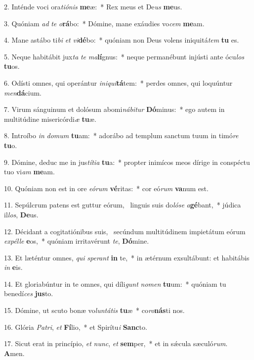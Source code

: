 2. Inténde voci ora\textit{ti}\textit{ó}\textit{nis} \textbf{me}æ:~*  Rex meus et De\textit{us} \textbf{me}us.\

3. Quóniam \textit{ad} \textit{te} \textit{o}\textbf{rá}bo:~*  Dómine, mane exáudies vo\textit{cem} \textbf{me}am.\

4. Mane astábo ti\textit{bi} \textit{et} \textit{vi}\textbf{dé}bo:~*  quóniam non Deus volens iniquitá\textit{tem} \textbf{tu} es.\

5. Neque habitábit jux\textit{ta} \textit{te} \textit{ma}\textbf{lí}gnus:~*  neque permanébunt injústi ante ócu\textit{los} \textbf{tu}os.\

6. Odísti omnes, qui operántur \textit{in}\textit{i}\textit{qui}\textbf{tá}tem:~*  perdes omnes, qui loquúntur \textit{men}\textbf{dá}cium.\

7. Virum sánguinum et dolósum abomi\textit{ná}\textit{bi}\textit{tur} \textbf{Dó}minus:~*  ego autem in multitúdine misericórdi\textit{æ} \textbf{tu}æ.\

8. Introíbo \textit{in} \textit{do}\textit{mum} \textbf{tu}am:~*  adorábo ad templum sanctum tuum in timó\textit{re} \textbf{tu}o.\

9. Dómine, deduc me in jus\textit{tí}\textit{ti}\textit{a} \textbf{tu}a:~*  propter inimícos meos dírige in conspéctu tuo vi\textit{am} \textbf{me}am.\

10. Quóniam non est in ore \textit{e}\textit{ó}\textit{rum} \textbf{vé}ritas:~*  cor eó\textit{rum} \textbf{va}num est.\

11. Sepúlcrum patens est guttur eórum, \dag\  linguis suis do\textit{ló}\textit{se} \textit{a}\textbf{gé}bant,~*  júdica il\textit{los}, \textbf{De}us.\

12. Décidant a cogitatiónibus suis, \dag\  secúndum multitúdinem impietátum eórum \textit{ex}\textit{pél}\textit{le} \textbf{e}os,~*  quóniam irritavérunt \textit{te}, \textbf{Dó}mine.\

13. Et læténtur omnes, \textit{qui} \textit{spe}\textit{rant} \textbf{in} te,~*  in ætérnum exsultábunt: et habitábis \textit{in} \textbf{e}is.\

14. Et gloriabúntur in te omnes, qui díli\textit{gunt} \textit{no}\textit{men} \textbf{tu}um:~*  quóniam tu benedí\textit{ces} \textbf{jus}to.\

15. Dómine, ut scuto bonæ vo\textit{lun}\textit{tá}\textit{tis} \textbf{tu}æ~*  co\textit{ro}\textbf{nás}ti nos.\

16. Glória \textit{Pa}\textit{tri}, \textit{et} \textbf{Fí}lio,~*  et Spirítu\textit{i} \textbf{Sanc}to.\

17. Sicut erat in princípio, \textit{et} \textit{nunc}, \textit{et} \textbf{sem}per,~*  et in sǽcula sæculó\textit{rum}. \textbf{A}men.\

